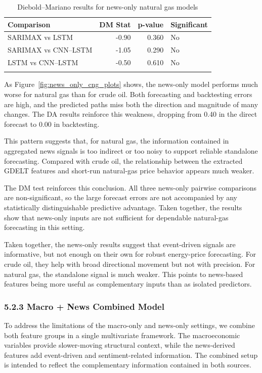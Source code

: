 \documentclass[pdflatex,sn-mathphys-num]{sn-jnl}%
\theoremstyle{thmstyleone}%
\theoremstyle{thmstyletwo}%
\theoremstyle{thmstylethree}%
\begin{document}
\begin{table}[h]
\centering
\small
\caption{Diebold--Mariano results for news-only natural gas models}
\label{tab:dm_news_cng}
\begin{tabular}{@{}lrrl@{}}
\toprule
Comparison & DM Stat & p-value & Significant \\
\midrule
SARIMAX vs LSTM & -0.90 & 0.360 & No \\
SARIMAX vs CNN--LSTM & -1.05 & 0.290 & No \\
LSTM vs CNN--LSTM & -0.50 & 0.610 & No \\
\botrule
\end{tabular}
\end{table}

As Figure~\ref{fig:news_only_cng_plots} shows, the news-only model performs much worse for natural gas than for crude oil. Both forecasting and backtesting errors are high, and the predicted paths miss both the direction and magnitude of many changes. The DA results reinforce this weakness, dropping from 0.40 in the direct forecast to 0.00 in backtesting.

This pattern suggests that, for natural gas, the information contained in aggregated news signals is too indirect or too noisy to support reliable standalone forecasting. Compared with crude oil, the relationship between the extracted GDELT features and short-run natural-gas price behavior appears much weaker.

The DM test reinforces this conclusion. All three news-only pairwise comparisons are non-significant, so the large forecast errors are not accompanied by any statistically distinguishable predictive advantage. Taken together, the results show that news-only inputs are not sufficient for dependable natural-gas forecasting in this setting.

Taken together, the news-only results suggest that event-driven signals are informative, but not enough on their own for robust energy-price forecasting. For crude oil, they help with broad directional movement but not with precision. For natural gas, the standalone signal is much weaker. This points to news-based features being more useful as complementary inputs than as isolated predictors.

\subsubsection*{5.2.3 Macro + News Combined Model}

To address the limitations of the macro-only and news-only settings, we combine both feature groups in a single multivariate framework. The macroeconomic variables provide slower-moving structural context, while the news-derived features add event-driven and sentiment-related information. The combined setup is intended to reflect the complementary information contained in both sources.
\end{document}
